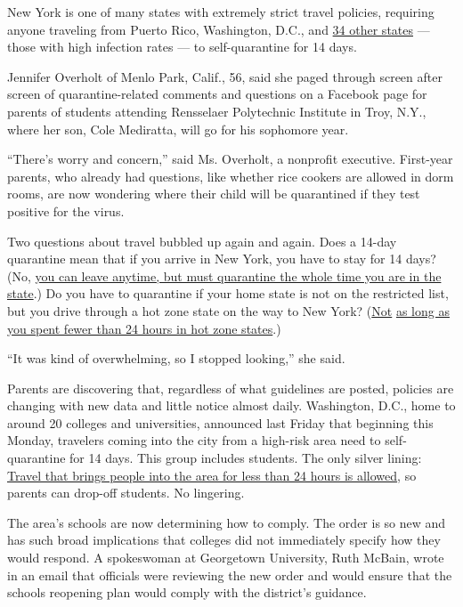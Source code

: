 New York is one of many states with extremely strict travel policies,
requiring anyone traveling from Puerto Rico, Washington, D.C., and
\href{https://coronavirus.health.ny.gov/covid-19-travel-advisory}{34
other states} --- those with high infection rates --- to self-quarantine
for 14 days.

Jennifer Overholt of Menlo Park, Calif., 56, said she paged through
screen after screen of quarantine-related comments and questions on a
Facebook page for parents of students attending Rensselaer Polytechnic
Institute in Troy, N.Y., where her son, Cole Mediratta, will go for his
sophomore year.

``There's worry and concern,'' said Ms. Overholt, a nonprofit executive.
First-year parents, who already had questions, like whether rice cookers
are allowed in dorm rooms, are now wondering where their child will be
quarantined if they test positive for the virus.

Two questions about travel bubbled up again and again. Does a 14-day
quarantine mean that if you arrive in New York, you have to stay for 14
days? (No,
\href{https://coronavirus.health.ny.gov/system/files/documents/2020/06/interimguidance_traveladvisory.pdf}{you
can leave anytime, but must quarantine the whole time you are in the
state}.) Do you have to quarantine if your home state is not on the
restricted list, but you drive through a hot zone state on the way to
New York?
(\href{https://coronavirus.health.ny.gov/system/files/documents/2020/06/interimguidance_traveladvisory.pdf}{Not}
\href{https://coronavirus.health.ny.gov/system/files/documents/2020/06/interimguidance_traveladvisory.pdf}{as
long as you spent fewer than 24 hours in hot zone states}.)

``It was kind of overwhelming, so I stopped looking,'' she said.

Parents are discovering that, regardless of what guidelines are posted,
policies are changing with new data and little notice almost daily.
Washington, D.C., home to around 20 colleges and universities, announced
last Friday that beginning this Monday, travelers coming into the city
from a high-risk area need to self-quarantine for 14 days. This group
includes students. The only silver lining:
\href{https://coronavirus.dc.gov/page/mayor\%E2\%80\%99s-order-2020-081-requirement-self-quarantine-after-non-essential-travel-during-covid-19}{Travel
that brings people into the area for less than 24 hours is allowed}, so
parents can drop-off students. No lingering.

The area's schools are now determining how to comply. The order is so
new and has such broad implications that colleges did not immediately
specify how they would respond. A spokeswoman at Georgetown University,
Ruth McBain, wrote in an email that officials were reviewing the new
order and would ensure that the schools reopening plan would comply with
the district's guidance.

